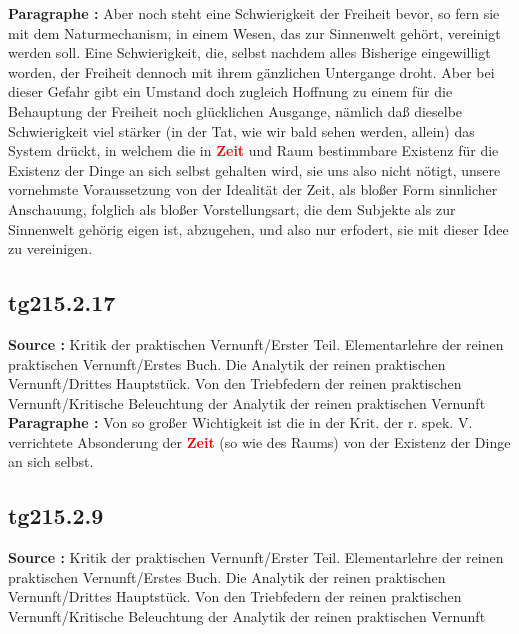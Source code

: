 \documentclass[a4paper,12pt,twoside]{book}
\newcommand{\match}[1]{\textcolor{red}{\textbf{#1}}}
\begin{document}
	\noindent\textbf{Paragraphe : }Aber noch steht eine Schwierigkeit der Freiheit bevor, so fern sie mit dem Naturmechanism, in einem Wesen, das zur Sinnenwelt gehört, vereinigt werden soll. Eine Schwierigkeit, die, selbst nachdem alles Bisherige eingewilligt worden, der Freiheit dennoch mit ihrem gänzlichen Untergange droht. Aber bei dieser Gefahr gibt ein Umstand doch zugleich Hoffnung zu einem für die Behauptung der Freiheit noch glücklichen Ausgange, nämlich daß dieselbe Schwierigkeit viel stärker (in der Tat, wie wir bald sehen werden, allein) das System drückt, in welchem die in \match{Zeit} und Raum bestimmbare Existenz für die Existenz der Dinge an sich selbst gehalten wird, sie uns also nicht nötigt, unsere vornehmste Voraussetzung von der Idealität der Zeit, als bloßer Form sinnlicher Anschauung, folglich als bloßer Vorstellungsart, die dem Subjekte als zur Sinnenwelt gehörig eigen ist, abzugehen, und also nur erfodert, sie mit dieser Idee zu vereinigen. 
	
	\subsection*{tg215.2.17} 
	\textbf{Source : }Kritik der praktischen Vernunft/Erster Teil. Elementarlehre der reinen praktischen Vernunft/Erstes Buch. Die Analytik der reinen praktischen Vernunft/Drittes Hauptstück. Von den Triebfedern der reinen praktischen Vernunft/Kritische Beleuchtung der Analytik der reinen praktischen Vernunft\\  
	
	\noindent\textbf{Paragraphe : }Von so großer Wichtigkeit ist die in der Krit. der r. spek. V. verrichtete Absonderung der \match{Zeit} (so wie des Raums) von der Existenz der Dinge an sich selbst. 
	
	\subsection*{tg215.2.9} 
	\textbf{Source : }Kritik der praktischen Vernunft/Erster Teil. Elementarlehre der reinen praktischen Vernunft/Erstes Buch. Die Analytik der reinen praktischen Vernunft/Drittes Hauptstück. Von den Triebfedern der reinen praktischen Vernunft/Kritische Beleuchtung der Analytik der reinen praktischen Vernunft\\  
	
\end{document}
